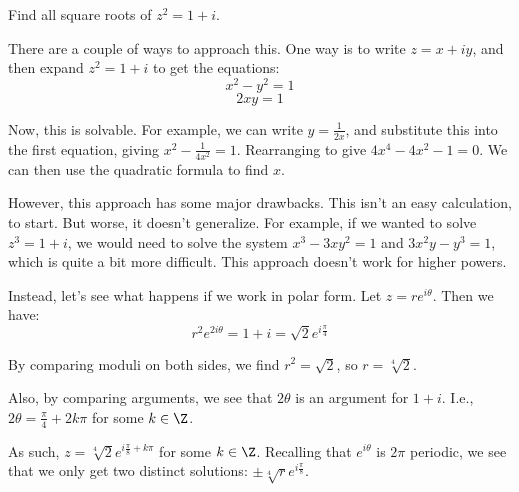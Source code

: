 \begin{ex}{}{} Find all square roots of $z^2 = 1 + i$.

There are a couple of ways to approach this. One way is to write $z = x + iy$, and then expand $z^2 = 1+i$ to get the equations:
$$x^2 - y^2 = 1$$
$$2xy = 1$$

Now, this is solvable. For example, we can write $y = \frac{1}{2x}$, and substitute this into the first equation, giving $x^2 - \frac{1}{4x^2} = 1$. Rearranging to give $4x^4 - 4x^2 - 1 = 0$. We can then use the quadratic formula to find $x$.

However, this approach has some major drawbacks. This isn't an easy calculation, to start. But worse, it doesn't generalize. For example, if we wanted to solve $z^3 = 1+i$, we would need to solve the system $x^3 - 3xy^2 = 1$ and $3x^2y - y^3 = 1$, which is quite a bit more difficult. This approach doesn't work for higher powers.

Instead, let's see what happens if we work in polar form. Let $z = re^{i\theta}$. Then we have:
$$r^2e^{2i\theta} = 1 + i = \sqrt{2}e^{i\frac{\pi}{4}}$$

By comparing moduli on both sides, we find $r^2 = \sqrt{2}$, so $r = \sqrt[4]{2}$.

Also, by comparing arguments, we see that $2\theta$ is an argument for $1 + i$. I.e., $2\theta = \frac{\pi}{4} + 2k\pi$ for some $k\in \Z$.

As such, $z = \sqrt[4]{2}e^{i\frac{\pi}{8} + k\pi}$ for some $k\in \Z$. Recalling that $e^{i\theta}$ is $2\pi$ periodic, we see that we only get two distinct solutions: $\pm\sqrt[4]{r}e^{i\frac{\pi}{8}}$. 
\end{ex}
